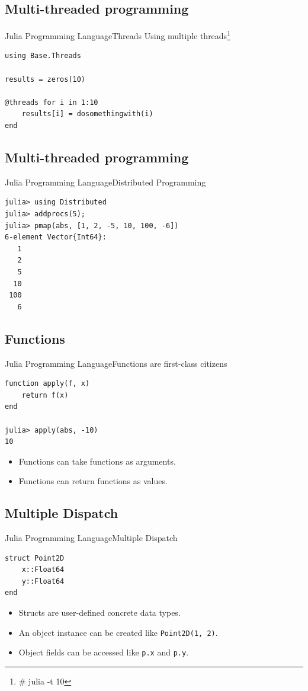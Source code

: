\documentclass[11pt]{beamer}
\begin{document}
\subsection{Multi-threaded programming}
\begin{frame}[fragile]{Julia Programming Language}{Threads}
Using multiple threads\footnote{\#\> julia -t 10} 
\begin{lstlisting}
using Base.Threads

results = zeros(10)
	
@threads for i in 1:10
	results[i] = dosomethingwith(i)
end 
\end{lstlisting}
\end{frame}


\subsection{Multi-threaded programming}
\begin{frame}[fragile]{Julia Programming Language}{Distributed Programming}
\begin{lstlisting}
julia> using Distributed
julia> addprocs(5);
julia> pmap(abs, [1, 2, -5, 10, 100, -6])
6-element Vector{Int64}:
   1
   2
   5
  10
 100
   6

\end{lstlisting}
\end{frame}


\subsection{Functions}
\begin{frame}[fragile]{Julia Programming Language}{Functions are first-class citizens}
\begin{lstlisting}
function apply(f, x)
	return f(x)
end 

julia> apply(abs, -10)
10
\end{lstlisting}
\begin{itemize}
\item Functions can take functions as arguments.
\item Functions can return functions as values.
\end{itemize}
\end{frame}


\subsection{Multiple Dispatch}
\begin{frame}[fragile]{Julia Programming Language}{Multiple Dispatch}
\begin{lstlisting}
struct Point2D 
	x::Float64
	y::Float64
end 
\end{lstlisting}
\begin{itemize}
\item Structs are user-defined concrete data types.
\item An object instance can be created like \texttt{Point2D(1, 2)}.
\item Object fields can be accessed like \texttt{p.x} and \texttt{p.y}.
\end{itemize}
\end{frame}
\end{document}
